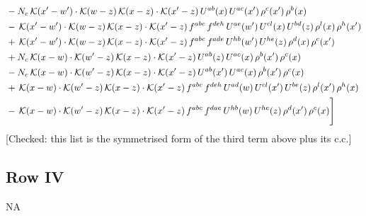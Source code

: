 \documentclass[9pt]{article}
\numberwithin{equation}{section}
\begin{document}
\begin{align}
&-N_{c}\,\mathcal{K}(x'-w')\cdot\mathcal{K}(w-z)\,\mathcal{K}(x-z)\cdot\mathcal{K}(x'-z)\,U^{ab}(x)\,U^{ac}(x')\,\rho^{c}(x')\,\rho^{b}(x)\notag \\
&-\,\mathcal{K}(x'-w')\cdot\mathcal{K}(w-z)\,\mathcal{K}(x-z)\cdot\mathcal{K}(x'-z)\,f^{abc}\,f^{deh}\,U^{ae}(w')\,U^{cl}(x)\,U^{bd}(z)\,\rho^{l}(x)\,\rho^{h}(x')\notag \\
&+\,\mathcal{K}(x'-w')\cdot\mathcal{K}(w-z)\,\mathcal{K}(x-z)\cdot\mathcal{K}(x'-z)\,f^{abc}\,f^{ade}\,U^{hb}(w')\,U^{he}(z)\,\rho^{d}(x)\,\rho^{c}(x')\notag \\
&+N_{c}\,\mathcal{K}(x-w)\cdot\mathcal{K}(w'-z)\,\mathcal{K}(x-z)\cdot\mathcal{K}(x'-z)\,U^{ab}(z)\,U^{ac}(x)\,\rho^{b}(x')\,\rho^{c}(x)\notag \\
&-N_{c}\,\mathcal{K}(x-w)\cdot\mathcal{K}(w'-z)\,\mathcal{K}(x-z)\cdot\mathcal{K}(x'-z)\,U^{ab}(x')\,U^{ac}(x)\,\rho^{b}(x')\,\rho^{c}(x)\notag \\
&+\,\mathcal{K}(x-w)\cdot\mathcal{K}(w'-z)\,\mathcal{K}(x-z)\cdot\mathcal{K}(x'-z)\,f^{abc}\,f^{deh}\,U^{ad}(w)\,U^{cl}(x')\,U^{be}(z)\,\rho^{l}(x')\,\rho^{h}(x)\notag \\
&-\,\mathcal{K}(x-w)\cdot\mathcal{K}(w'-z)\,\mathcal{K}(x-z)\cdot\mathcal{K}(x'-z)\,f^{abc}\,f^{dae}\,U^{hb}(w)\,U^{he}(z)\,\rho^{d}(x')\,\rho^{c}(x)\Bigg]
\end{align} {\color{red}[Checked: this list is the symmetrised form of the third term above plus its c.c.]}\par\noindent
\subsection{Row IV}
\textsc{NA}
\end{document}
